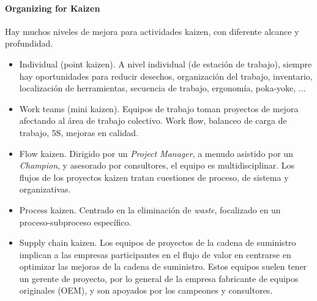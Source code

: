 \documentclass[]{article}
\begin{document}
\paragraph{Organizing for Kaizen}

Hay muchos niveles de mejora para actividades kaizen, con diferente alcance y profundidad.
\begin{itemize}
	\item Individual (point kaizen). A nivel individual (de estación de trabajo), siempre hay oportunidades para reducir desechos, organización del trabajo, inventario, localización de herramientas, secuencia de trabajo, ergonomía, poka-yoke, ...
	\item Work teams (mini kaizen). Equipos de trabajo toman proyectos de mejora afectando al área de trabajo colectivo. Work flow, balanceo de carga de trabajo, 5S, mejoras en calidad.
	\item Flow kaizen. Dirigido por un \textit{Project Manager}, a menudo asistido por un \textit{Champion}, y asesorado por consultores, el equipo es multidisciplinar. Los flujos de los proyectos kaizen tratan cuestiones de proceso, de sistema y organizativas. 
	\item Process kaizen. Centrado en la eliminación de \textit{waste}, focalizado en un proceso-subproceso específico.
	\item Supply chain kaizen. Los equipos de proyectos de la cadena de suministro implican a las empresas participantes en el flujo de valor en centrarse en optimizar las mejoras de la cadena de suministro. Estos equipos suelen tener un gerente de proyecto, por lo general de la empresa fabricante de equipos originales (OEM), y son apoyados por los campeones y consultores.
\end{itemize}
\end{document}
